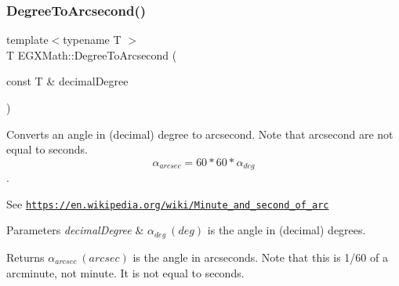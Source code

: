 \subsubsection{\texorpdfstring{Degree\+To\+Arcsecond()}{DegreeToArcsecond()}}
{\footnotesize\ttfamily template$<$typename T $>$ \\
T E\+G\+X\+Math\+::\+Degree\+To\+Arcsecond (\begin{DoxyParamCaption}\item[{const T \&}]{decimal\+Degree }\end{DoxyParamCaption})}



Converts an angle in (decimal) degree to arcsecond. Note that arcsecond are not equal to seconds. \[\alpha_{arcsec}=60 * 60 * \alpha_{deg}\]. 

See \href{https://en.wikipedia.org/wiki/Minute_and_second_of_arc}{\tt https\+://en.\+wikipedia.\+org/wiki/\+Minute\+\_\+and\+\_\+second\+\_\+of\+\_\+arc} 
\begin{DoxyParams}{Parameters}
{\em decimal\+Degree} & $\alpha_{deg}\ (deg)$ is the angle in (decimal) degrees. \\
\hline
\end{DoxyParams}
\begin{DoxyReturn}{Returns}
$\alpha_{arcsec}\ (arcsec)$ is the angle in arcseconds. Note that this is 1/60 of a arcminute, not minute. It is not equal to seconds. 
\end{DoxyReturn}
